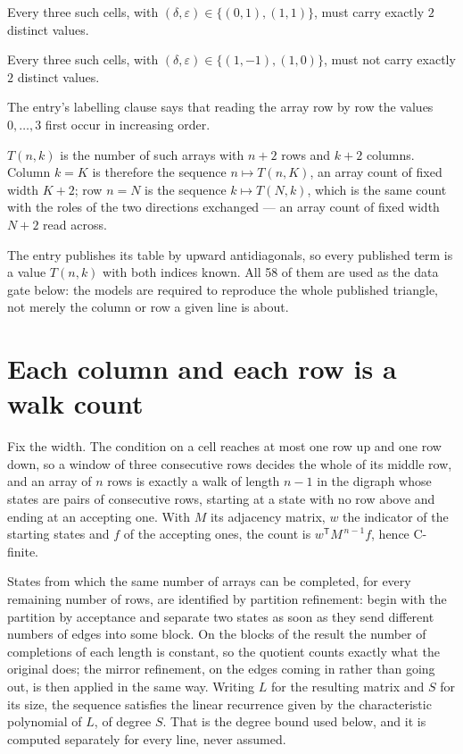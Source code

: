 \documentclass[11pt]{article}
\theoremstyle{definition}
\begin{document}
Every three such cells, with $(\delta,\varepsilon) \in \{(0,1), (1,1)\}$, must carry exactly $2$ distinct values.

Every three such cells, with $(\delta,\varepsilon) \in \{(1,-1), (1,0)\}$, must not carry exactly $2$ distinct values.

The entry's labelling clause says that reading the array row by row the values $0,\dots,3$ first occur in increasing order.

$T(n,k)$ is the number of such arrays with $n + 2$ rows and $k + 2$ columns. Column $k = K$ is therefore the sequence $n \mapsto T(n,K)$, an array count of fixed width $K + 2$; row $n = N$ is the sequence $k \mapsto T(N,k)$, which is the same count with the roles of the two directions exchanged --- an array count of fixed width $N + 2$ read across.

The entry publishes its table by upward antidiagonals, so every published term is a value $T(n,k)$ with both indices known. All 58 of them are used as the data gate below: the models are required to reproduce the whole published triangle, not merely the column or row a given line is about.

\section{Each column and each row is a walk count}

Fix the width. The condition on a cell reaches at most one row up and one row down, so a window of three consecutive rows decides the whole of its middle row, and an array of $n$ rows is exactly a walk of length $n-1$ in the digraph whose states are pairs of consecutive rows, starting at a state with no row above and ending at an accepting one. With $M$ its adjacency matrix, $w$ the indicator of the starting states and $f$ of the accepting ones, the count is $w^{\mathsf T}M^{\,n-1}f$, hence C-finite.

States from which the same number of arrays can be completed, for every remaining number of rows, are identified by partition refinement: begin with the partition by acceptance and separate two states as soon as they send different numbers of edges into some block. On the blocks of the result the number of completions of each length is constant, so the quotient counts exactly what the original does; the mirror refinement, on the edges coming in rather than going out, is then applied in the same way. Writing $L$ for the resulting matrix and $S$ for its size, the sequence satisfies the linear recurrence given by the characteristic polynomial of $L$, of degree $S$. That is the degree bound used below, and it is computed separately for every line, never assumed.
\end{document}
